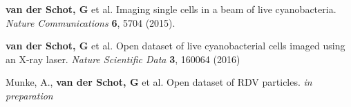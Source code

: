 \documentclass{UUThesisTemplate}
\begin{document}
\frontmatter
    \frontmatterCS 
 
   \dedication{Dedicated to new Life: Emmanuel and Mathis}
 
    \begin{listofpapers}
    	\item \textbf{van der Schot, G} et al. Imaging single cells in a beam of live cyanobacteria. \textit{Nature Communications} \textbf{6}, 5704 (2015). %
        \item \textbf{van der Schot, G} et al. Open dataset of live cyanobacterial cells imaged using an X-ray laser. \textit{Nature Scientific Data} \textbf{3},  160064 (2016)%
        \item Munke, A., \textbf{van der Schot, G} et al. Open dataset of RDV particles. \textit{in preparation} %
        
    \end{listofpapers}
    
\end{document}
